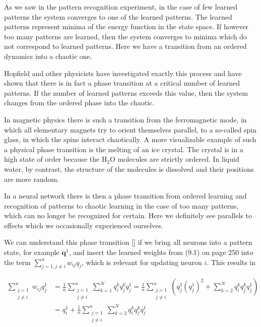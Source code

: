\documentclass[10pt]{article}
\begin{document}
As we saw in the pattern recognition experiment, in the case of few learned patterns the system converges to one of the learned patterns. The learned patterns represent minima of the energy function in the state space. If however too many patterns are learned, then the system converges to minima which do not correspond to learned patterns. Here we have a transition from an ordered dynamics into a chaotic one.

Hopfield and other physicists have investigated exactly this process and have shown that there is in fact a phase transition at a critical number of learned patterns. If the number of learned patterns exceeds this value, then the system changes from the ordered phase into the chaotic.

In magnetic physics there is such a transition from the ferromagnetic mode, in which all elementary magnets try to orient themselves parallel, to a so-called spin glass, in which the spins interact chaotically. A more visualizable example of such a physical phase transition is the melting of an ice crystal. The crystal is in a high state of order because the $\mathrm{H}_{2} \mathrm{O}$ molecules are strictly ordered. In liquid water, by contrast, the structure of the molecules is dissolved and their positions are more random.

In a neural network there is then a phase transition from ordered learning and recognition of patterns to chaotic learning in the case of too many patterns, which can no longer be recognized for certain. Here we definitely see parallels to effects which we occasionally experienced ourselves.

We can understand this phase transition [\cite{ritter1992neural}] if we bring all neurons into a pattern state, for example $\boldsymbol{q}^{1}$, and insert the learned weights from (9.1) on page 250 into the term $\sum_{j=1, j \neq i}^{n} w_{i j} q_{j}$, which is relevant for updating neuron $i$. This results in

$$
\begin{aligned}
\sum_{\substack{j=1 \\
j \neq i}}^{n} w_{i j} q_{j}^{1} & =\frac{1}{n} \sum_{\substack{j=1 \\
j \neq i}}^{n} \sum_{k=1}^{N} q_{i}^{k} q_{j}^{k} q_{j}^{1}=\frac{1}{n} \sum_{\substack{j=1 \\
j \neq i}}^{n}\left(q_{j}^{1}\left(q_{j}^{1}\right)^{2}+\sum_{k=2}^{N} q_{i}^{k} q_{j}^{k} q_{j}^{1}\right) \\
& =q_{i}^{1}+\frac{1}{n} \sum_{\substack{j=1 \\
j \neq i}}^{n} \sum_{k=2}^{N} q_{i}^{k} q_{j}^{k} q_{j}^{1}
\end{aligned}
$$
\end{document}
